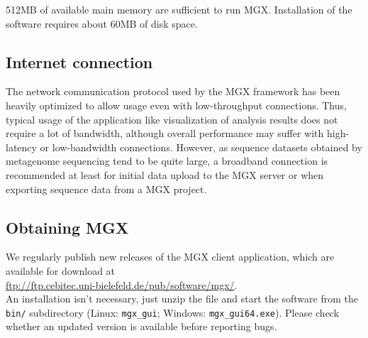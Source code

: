 512MB of available main memory are sufficient to run MGX. Installation of the
software requires about 60MB of disk space.

\subsection{Internet connection}

The network communication protocol used by the MGX framework has been heavily optimized to
allow usage even with low-throughput connections. Thus, typical usage of the application
like visualization of analysis results does not require a lot of bandwidth, although
overall performance may suffer with high-latency or low-bandwidth connections. However, as
sequence datasets obtained by metagenome sequencing tend to be quite large, a broadband 
connection is recommended at least for initial data upload to the MGX server or when exporting
sequence data from a MGX project.

\subsection{Obtaining MGX}

We regularly publish new releases of the MGX client application, which are
available for download at\\

    \url{ftp://ftp.cebitec.uni-bielefeld.de/pub/software/mgx/}.\\

An installation isn't necessary, just unzip the file and start the software
from the \texttt{bin/} subdirectory (Linux: \texttt{mgx\_gui}; Windows: \texttt{mgx\_gui64.exe}). Please check whether an updated version
is available before reporting bugs.


